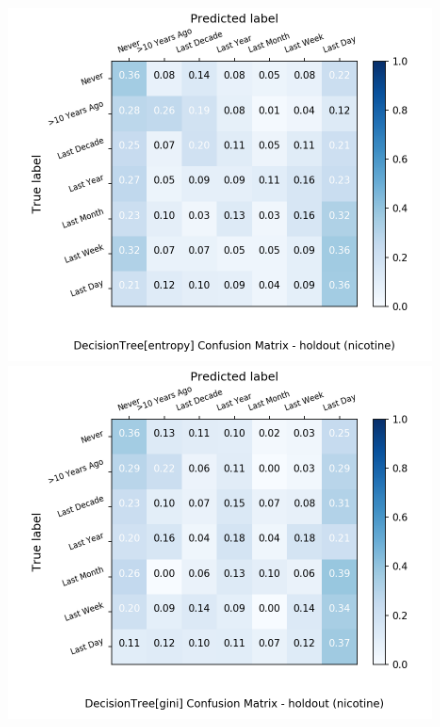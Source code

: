 \begin{figure}[H]
	\centering
	\begin{minipage}[b]{0.32\textwidth}
		\includegraphics[width=1.1\textwidth]{Plots/nicotine_DecisionTree_entropy_balance_False_holdout.png}
	\end{minipage}
	\begin{minipage}[b]{0.32\textwidth}
		\includegraphics[width=1.1\textwidth]{Plots/nicotine_DecisionTree_gini_balance_False_holdout.png}
	\end{minipage}
	\begin{minipage}[b]{0.32\textwidth}

\end{minipage}
\end{figure}
